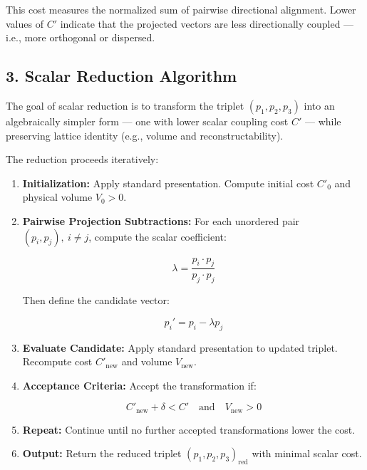 \documentclass[preprint]{iucr}              %
\numberwithin{equation}{section}
\begin{document}
	
	
	This cost measures the normalized sum of pairwise directional alignment. Lower values of \( C' \) indicate that the projected vectors are less directionally coupled — i.e., more orthogonal or dispersed.
	
	\vspace{1em}
	
	\subsection{3. Scalar Reduction Algorithm}
	
	The goal of scalar reduction is to transform the triplet \( (p_1, p_2, p_3) \) into an algebraically simpler form — one with lower scalar coupling cost \( C' \) — while preserving lattice identity (e.g., volume and reconstructability).
	
	The reduction proceeds iteratively:
	
	\begin{enumerate}
		\item \textbf{Initialization:}
		Apply standard presentation. Compute initial cost \( C'_0 \) and physical volume \( V_0 > 0 \).
		
		\item \textbf{Pairwise Projection Subtractions:}
		For each unordered pair \( (p_i, p_j),\ i \neq j \), compute the scalar coefficient:
		
		
		\[
		\lambda = \frac{p_i \cdot p_j}{p_j \cdot p_j}
		\]
		
		
		Then define the candidate vector:
		
		
		\[
		p_i' = p_i - \lambda p_j
		\]
		
		
		
		\item \textbf{Evaluate Candidate:}
		Apply standard presentation to updated triplet. Recompute cost \( C'_{\text{new}} \) and volume \( V_{\text{new}} \).
		
		\item \textbf{Acceptance Criteria:}
		Accept the transformation if:
		
		
		\[
		C'_{\text{new}} + \delta < C' \quad \text{and} \quad V_{\text{new}} > 0
		\]
		
		
		
		\item \textbf{Repeat:}
		Continue until no further accepted transformations lower the cost.
		
		\item \textbf{Output:}
		Return the reduced triplet \( (p_1, p_2, p_3)_{\text{red}} \) with minimal scalar cost.
	\end{enumerate}
	
\end{document}
